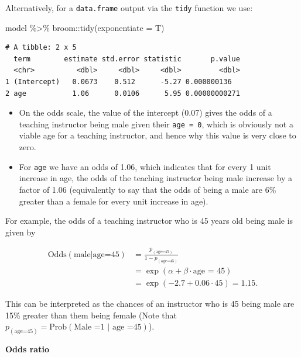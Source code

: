 \documentclass[
  letterpaper,
  DIV=11,
  numbers=noendperiod]{scrartcl}
\newenvironment{Shaded}{\begin{snugshade}}{\end{snugshade}}
\newcommand{\AttributeTok}[1]{\textcolor[rgb]{0.40,0.45,0.13}{#1}}
\newcommand{\FunctionTok}[1]{\textcolor[rgb]{0.28,0.35,0.67}{#1}}
\newcommand{\NormalTok}[1]{\textcolor[rgb]{0.00,0.23,0.31}{#1}}
\newcommand{\SpecialCharTok}[1]{\textcolor[rgb]{0.37,0.37,0.37}{#1}}
\begin{document}
Alternatively, for a \texttt{data.frame} output via the \texttt{tidy}
function we use:

\begin{Shaded}
\begin{Highlighting}[]
\NormalTok{model }\SpecialCharTok{\%\textgreater{}\%}\NormalTok{ broom}\SpecialCharTok{::}\FunctionTok{tidy}\NormalTok{(}\AttributeTok{exponentiate =}\NormalTok{ T)}
\end{Highlighting}
\end{Shaded}

\begin{verbatim}
# A tibble: 2 x 5
  term        estimate std.error statistic       p.value
  <chr>          <dbl>     <dbl>     <dbl>         <dbl>
1 (Intercept)   0.0673    0.512      -5.27 0.000000136  
2 age           1.06      0.0106      5.95 0.00000000271
\end{verbatim}

\begin{itemize}
\item
  On the odds scale, the value of the intercept (0.07) gives the odds of
  a teaching instructor being male given their \texttt{age\ =\ 0}, which
  is obviously not a viable age for a teaching instructor, and hence why
  this value is very close to zero.
\item
  For \texttt{age} we have an odds of 1.06, which indicates that for
  every 1 unit increase in age, the odds of the teaching instructor
  being male increase by a factor of 1.06 (equivalently to say that the
  odds of being a male are 6\% greater than a female for every unit
  increase in age).
\end{itemize}

For example, the odds of a teaching instructor who is 45 years old being
male is given by

\begin{align} \text{Odds}(\text{male|age=45}) &= \frac{p_{(\text{age=45})}}{1-p_{(\text{age=45})}} \\
&= \exp\left(\alpha + \beta \cdot \textrm{age = 45}\right) \\
&= \exp\left(-2.7 + 0.06 \cdot 45\right) = 1.15. \nonumber \end{align}

This can be interpreted as the chances of an instructor who is 45 being
male are 15\% greater than them being female (Note that
\(p_{(\text{age=45})}= \text{Prob}(\text{Male =1 | age =45})\)).

\textbf{Odds ratio}
\end{document}
